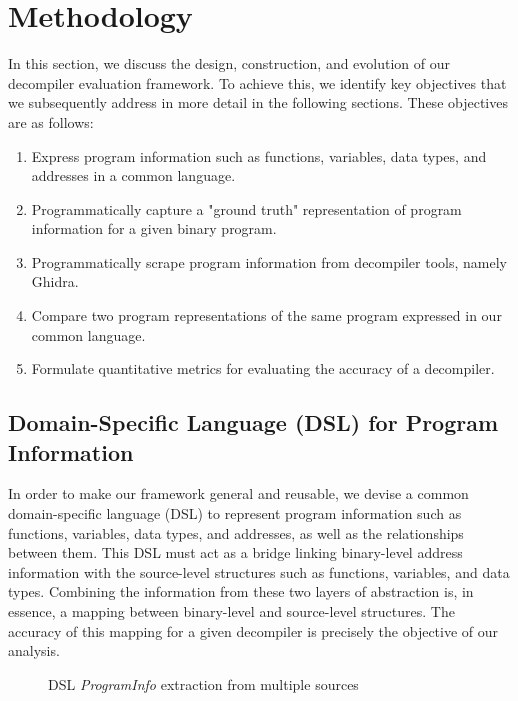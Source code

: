 \chapter{Methodology} \label{sec:methodology}

In this section, we discuss the design, construction, and evolution of our decompiler evaluation framework. To achieve this, we identify key objectives that we subsequently address in more detail in the following sections. These objectives are as follows:

\begin{enumerate}
    \item Express program information such as functions, variables, data types, and addresses in a common language.
    \item Programmatically capture a "ground truth" representation of program information for a given binary program.
    \item Programmatically scrape program information from decompiler tools, namely Ghidra.
    \item Compare two program representations of the same program expressed in our common language.
    \item Formulate quantitative metrics for evaluating the accuracy of a decompiler.
\end{enumerate}

\section{Domain-Specific Language (DSL) for Program Information}

In order to make our framework general and reusable, we devise a common domain-specific language (DSL) to represent program information such as functions, variables, data types, and addresses, as well as the relationships between them. This DSL must act as a bridge linking binary-level address information with the source-level structures such as functions, variables, and data types. Combining the information from these two layers of abstraction is, in essence, a mapping between binary-level and source-level structures. The accuracy of this mapping for a given decompiler is precisely the objective of our analysis.

\begin{figure}
    \centering
    \scalebox{0.8}{
        
    }
    \caption{DSL \emph{ProgramInfo} extraction from multiple sources}
    \label{fig:proginfo-sources}
\end{figure}

